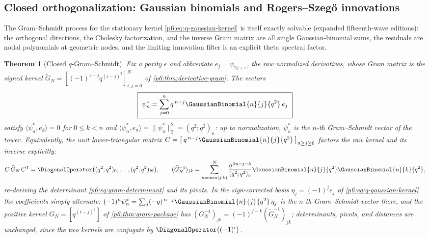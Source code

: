 \documentclass[11pt,oneside]{article}
\numberwithin{equation}{section}
\newtheorem{theorem}{Theorem}[section]
\theoremstyle{definition}
\theoremstyle{remark}
\begin{document}
\subsection{Closed orthogonalization: Gaussian binomials and Rogers--Szeg\H{o} innovations}

The Gram--Schmidt process for the stationary kernel
\eqref{p6:eq:q-gaussian-kernel} is itself exactly solvable (expanded
fifteenth-wave editions): the orthogonal directions, the Cholesky
factorization, and the inverse Gram matrix are all single
Gaussian-binomial sums, the residuals are nodal polynomials at geometric
nodes, and the limiting innovation filter is an explicit theta spectral
factor.

\begin{theorem}[Closed $q$-Gram--Schmidt]\label{p6:thm:q-gram-schmidt}
Fix a parity $\epsilon$ and abbreviate $e_j=\psi_{2j+\epsilon}$, the raw
normalized derivatives, whose Gram matrix is the \emph{signed} kernel
$\widetilde G_N=[(-1)^{i-j}q^{(i-j)^2}]_{i,j=0}^{N}$ of
\cref{p6:thm:derivative-gram}.  The vectors
\begin{equation}\label{p6:eq:q-gram-schmidt}
 \boxed{\ \psi_n^{\ast}
 =\sum_{j=0}^{n}q^{\,n-j}\GaussianBinomial{n}{j}{q^2}\,e_j\ }
\end{equation}
satisfy $\langle\psi_n^{\ast},e_k\rangle=0$ for $0\le k<n$ and
$\langle\psi_n^{\ast},e_n\rangle=\|\psi_n^{\ast}\|_2^2=(q^2;q^2)_n$: up to
normalization, $\psi_n^{\ast}$ is the $n$-th Gram--Schmidt vector of the
tower.  Equivalently, the unit lower-triangular matrix
$C=\bigl[\,q^{\,n-j}\GaussianBinomial{n}{j}{q^2}\,\bigr]_{n\ge j\ge0}$ factors the
raw kernel and its inverse explicitly:
\[
 C\,\widetilde G_N\,C^{\mathsf T}
 =\DiagonalOperator\bigl((q^2;q^2)_0,\ldots,(q^2;q^2)_N\bigr),
 \qquad
 (\widetilde G_N^{-1})_{jk}
 =\sum_{n=\max(j,k)}^{N}
 \frac{q^{\,2n-j-k}}{(q^2;q^2)_n}
 \GaussianBinomial{n}{j}{q^2}\GaussianBinomial{n}{k}{q^2},
\]
re-deriving the determinant \eqref{p6:eq:gram-determinant} and its pivots.
In the sign-corrected basis $\eta_j=(-1)^je_j$ of
\eqref{p6:eq:q-gaussian-kernel} the coefficients simply alternate:
$(-1)^n\psi_n^{\ast}=\sum_j(-q)^{\,n-j}\GaussianBinomial{n}{j}{q^2}\,\eta_j$ is the
$n$-th Gram--Schmidt vector there, and the positive kernel
$G_N=[q^{(i-j)^2}]$ of \cref{p6:thm:gram-package} has
$(G_N^{-1})_{jk}=(-1)^{j-k}(\widetilde G_N^{-1})_{jk}$; determinants,
pivots, and distances are unchanged, since the two kernels are conjugate by
$\DiagonalOperator\bigl((-1)^i\bigr)$.
\end{theorem}
\end{document}
